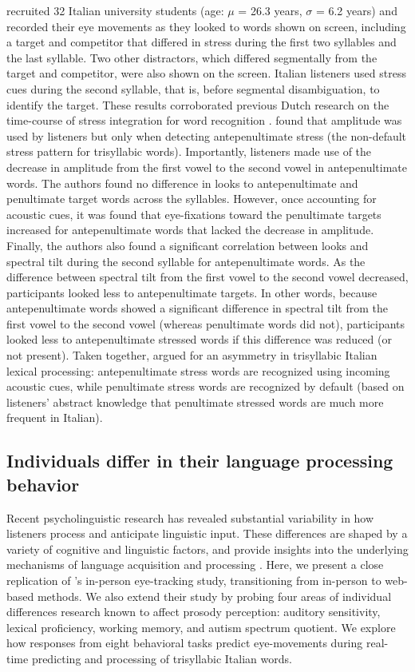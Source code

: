 \cite{Sulpizio_McQueen_2012} recruited 32 Italian university students (age: $\mu$ = 26.3 years, $\sigma$ = 6.2 years) and recorded their eye movements as they looked to words shown on screen, including a target and competitor that differed in stress during the first two syllables and the last syllable. Two other distractors, which differed segmentally from the target and competitor, were also shown on the screen. Italian listeners used stress cues during the second syllable, that is, before segmental disambiguation, to identify the target. These results corroborated previous Dutch research on the time-course of stress integration for word recognition \citep{Reinisch2010}. \cite{Sulpizio_McQueen_2012} found that amplitude was used by listeners but only when detecting antepenultimate stress (the non-default stress pattern for trisyllabic words). Importantly, listeners made use of the decrease in amplitude from the first vowel to the second vowel in antepenultimate words. The authors found no difference in looks to antepenultimate and penultimate target words across the syllables. However, once accounting for acoustic cues, it was found that eye-fixations toward the penultimate targets increased for antepenultimate words that lacked the decrease in amplitude. Finally, the authors also found a significant correlation between looks and spectral tilt during the second syllable for antepenultimate words. As the difference between spectral tilt from the first vowel to the second vowel decreased, participants looked less to antepenultimate targets. In other words, because antepenultimate words showed a significant difference in spectral tilt from the first vowel to the second vowel (whereas penultimate words did not), participants looked less to antepenultimate stressed words if this difference was reduced (or not present). Taken together, \cite{Sulpizio_McQueen_2012} argued for an asymmetry in trisyllabic Italian lexical processing: antepenultimate stress words are recognized using incoming acoustic cues, while penultimate stress words are recognized by default (based on listeners' abstract knowledge that penultimate stressed words are much more frequent in Italian). 


\subsection{Individuals differ in their language processing behavior}

Recent psycholinguistic research has revealed substantial variability in how listeners process and anticipate linguistic input. These differences are shaped by a variety of cognitive and linguistic factors, and provide insights into the underlying mechanisms of language acquisition and processing \citep{Huettig2016, Kidd2018}. Here, we present a close replication of \cite{Sulpizio_McQueen_2012}'s in-person eye-tracking study, transitioning from in-person to web-based methods. We also extend their study by probing four areas of individual differences research known to affect prosody perception: auditory sensitivity, lexical proficiency, working memory, and autism spectrum quotient. We explore how responses from eight behavioral tasks predict eye-movements during real-time predicting and processing of trisyllabic Italian words.


